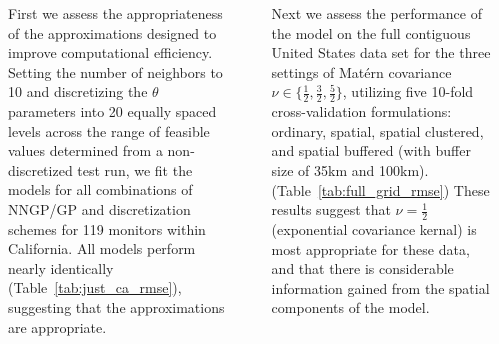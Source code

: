 \documentclass[20pt,margin=1in,innermargin=-4.5in,blockverticalspace=-0.3in]{tikzposter}
\begin{document}
\begin{columns}
{        First we assess the appropriateness of the approximations designed to improve computational efficiency. 
        Setting the number of neighbors to 10 and discretizing the $\theta$ parameters into 20 equally spaced levels across the range of feasible values determined from a non-discretized test run, we fit the models for all combinations of NNGP/GP and discretization schemes for 119 monitors within California.
        All models perform nearly identically \relax (Table~\ref{tab:just_ca_rmse}), suggesting that the approximations are appropriate. 
         \begin{center}
             \label{tab:just_ca_rmse}
             \resizebox{12cm}{!}{
                 
         }
         \end{center}
         Next we assess the performance of the model on the full contiguous United States data set for the three settings of Mat\'{e}rn covariance $\nu \in \{\frac{1}{2}, \frac{3}{2}, \frac{5}{2}\}$,  utilizing five 10-fold cross-validation formulations: ordinary, spatial, spatial clustered, and spatial buffered (with buffer size of 35km and 100km).\relax(Table~\ref{tab:full_grid_rmse})
         These results suggest that $\nu = \frac{1}{2}$ (exponential covariance kernal) is most appropriate for these data, and that there is considerable information gained from the spatial components of the model.
         \begin{center}
             \label{tab:full_grid_rmse}
             \resizebox{16cm}{!}{
                 
         }
         \end{center}
     }



\end{columns}
\end{document}
